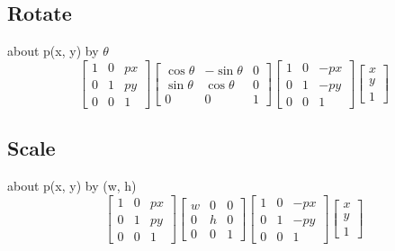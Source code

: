\subsection{Rotate}
about p(x, y)
by $\theta$
\[
\begin{bmatrix}
1 & 0 & px\\
0 & 1 & py\\
0 & 0 & 1
\end{bmatrix}
\begin{bmatrix}
\cos \theta & -\sin \theta & 0\\
\sin \theta &  \cos \theta & 0\\
0 & 0 & 1
\end{bmatrix}
\begin{bmatrix}
1 & 0 & -px\\
0 & 1 & -py\\
0 & 0 & 1
\end{bmatrix}
\begin{bmatrix}
x\\
y\\
1
\end{bmatrix}
\]

\subsection{Scale}
about p(x, y)
by (w, h)
\[
\begin{bmatrix}
1 & 0 & px\\
0 & 1 & py\\
0 & 0 & 1
\end{bmatrix}
\begin{bmatrix}
w & 0 & 0\\
0 & h & 0\\
0 & 0 & 1
\end{bmatrix}
\begin{bmatrix}
1 & 0 & -px\\
0 & 1 & -py\\
0 & 0 & 1
\end{bmatrix}
\begin{bmatrix}
x\\
y\\
1
\end{bmatrix}
\]


